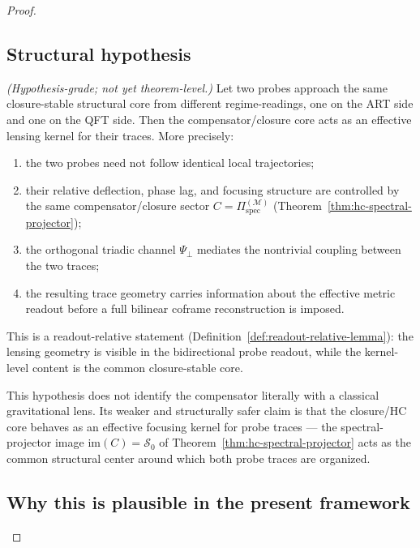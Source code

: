 \begin{proof}
\subsection*{Structural hypothesis}

\begin{proposition}
\label{hyp:bidirectional-probe-lensing}
\emph{(Hypothesis-grade; not yet theorem-level.)}
Let two probes approach the same closure-stable structural core from
different regime-readings, one on the ART side and one on the QFT side.
Then the compensator/closure core acts as an effective lensing kernel
for their traces. More precisely:
\begin{enumerate}[label=(\roman*)]
  \item the two probes need not follow identical local trajectories;
  \item their relative deflection, phase lag, and focusing structure are
        controlled by the same compensator/closure sector
        $C = \Pi^{(\mathcal{M})}_{\mathrm{spec}}$
        (Theorem~\ref{thm:hc-spectral-projector});
  \item the orthogonal triadic channel $\Psi_\perp$ mediates the
        nontrivial coupling between the two traces;
  \item the resulting trace geometry carries information about the
        effective metric readout before a full bilinear coframe
        reconstruction is imposed.
\end{enumerate}
This is a readout-relative statement
(Definition~\ref{def:readout-relative-lemma}): the lensing geometry is
visible in the bidirectional probe readout, while the kernel-level
content is the common closure-stable core.
\end{proposition}

\begin{remark}
This hypothesis does not identify the compensator literally with a
classical gravitational lens. Its weaker and structurally safer claim
is that the closure/HC core behaves as an effective focusing kernel for
probe traces --- the spectral-projector image $\mathrm{im}(C) =
\mathcal{S}_0$ of Theorem~\ref{thm:hc-spectral-projector} acts as the
common structural center around which both probe traces are organized.
\end{remark}

\subsection*{Why this is plausible in the present framework}


\end{proof}
